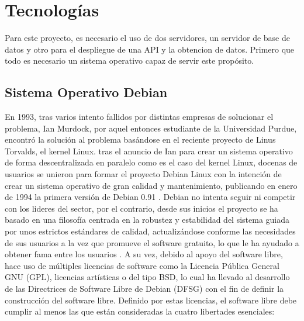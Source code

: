 \chapter[Tecnologías]{Tecnologías}
\label{Chap3}

Para este proyecto, es necesario el uso de dos servidores, un servidor de base de datos y otro para el despliegue de una API y la obtencion de datos.\newline
\newline
Primero que todo es necesario un sistema operativo capaz de servir este propósito.

\section{Sistema Operativo Debian}
En 1993, tras varios intento fallidos por distintas empresas de solucionar el problema, Ian Murdock, por aquel entonces estudiante de la Universidad Purdue, encontró la solución al problema basándose en el reciente proyecto de Linus Torvalds, el kernel Linux. tras el anuncio de Ian para crear un sistema operativo de forma descentralizada en paralelo como es el caso del kernel Linux, docenas de usuarios se unieron para formar el proyecto Debian Linux con la intención de crear un sistema operativo de gran calidad y mantenimiento, publicando en enero de 1994 la primera versión de Debian 0.91 \cite{krafft2005debian} \cite{DebHis}.\newline
\newline
Debian no intenta seguir ni competir con los lideres del sector, por el contrario, desde sus inicios el proyecto se ha basado en una filosofía centrada en la robustez y estabilidad del sistema guiada por unos estrictos estándares de calidad, actualizándose conforme las necesidades de sus usuarios a la vez que promueve el software gratuito, lo que le ha ayudado a obtener fama entre los usuarios \cite{DebFil} \cite{pollei2013debian}.\newline
\newline
A su vez, debido al apoyo del software libre, hace uso de múltiples licencias de software como la Licencia Pública General GNU (GPL), licencias artísticas o del tipo BSD, lo cual ha llevado al desarrollo de las Directrices de Software Libre de Debian (DFSG) con el fin de definir la construcción del software libre. \cite{DebFree}\newline
\newline
Definido por estas licencias, el software libre debe cumplir al menos las que están consideradas la cuatro libertades esenciales: \cite{GnuFS}

